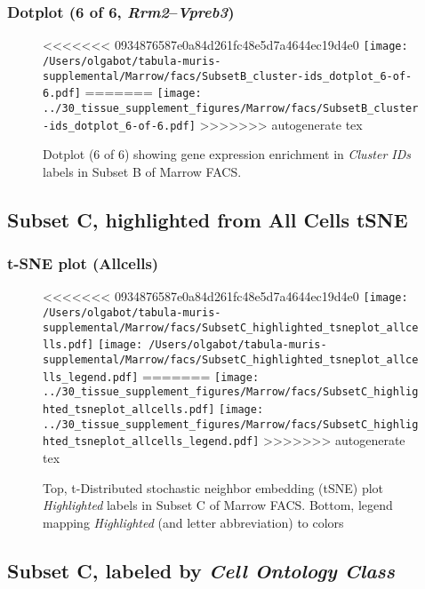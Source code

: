 \clearpage

\subsubsection{Dotplot (6 of 6, \emph{Rrm2}--\emph{Vpreb3})}
\begin{figure}[h]
\centering
<<<<<<< 0934876587e0a84d261fc48e5d7a4644ec19d4e0
\texttt{[image: /Users/olgabot/tabula-muris-supplemental/Marrow/facs/SubsetB\_cluster-ids\_dotplot\_6-of-6.pdf]}
=======
\texttt{[image: ../30\_tissue\_supplement\_figures/Marrow/facs/SubsetB\_cluster-ids\_dotplot\_6-of-6.pdf]}
>>>>>>> autogenerate tex

\caption{ Dotplot (6 of 6)  showing gene expression enrichment in \emph{Cluster IDs} labels in Subset B of Marrow FACS. }
\end{figure}


\clearpage
\subsection{Subset C, highlighted from All Cells tSNE}
\subsubsection{t-SNE plot (Allcells)}
\begin{figure}[h]
\centering
<<<<<<< 0934876587e0a84d261fc48e5d7a4644ec19d4e0
\texttt{[image: /Users/olgabot/tabula-muris-supplemental/Marrow/facs/SubsetC\_highlighted\_tsneplot\_allcells.pdf]}
\texttt{[image: /Users/olgabot/tabula-muris-supplemental/Marrow/facs/SubsetC\_highlighted\_tsneplot\_allcells\_legend.pdf]}
=======
\texttt{[image: ../30\_tissue\_supplement\_figures/Marrow/facs/SubsetC\_highlighted\_tsneplot\_allcells.pdf]}
\texttt{[image: ../30\_tissue\_supplement\_figures/Marrow/facs/SubsetC\_highlighted\_tsneplot\_allcells\_legend.pdf]}
>>>>>>> autogenerate tex
\caption{Top, t-Distributed stochastic neighbor embedding (tSNE) plot  \emph{Highlighted} labels in Subset C of Marrow FACS. Bottom, legend mapping \emph{Highlighted} (and letter abbreviation) to colors}
\end{figure}


\clearpage

\subsection{Subset C, labeled by \emph{Cell Ontology Class}}
